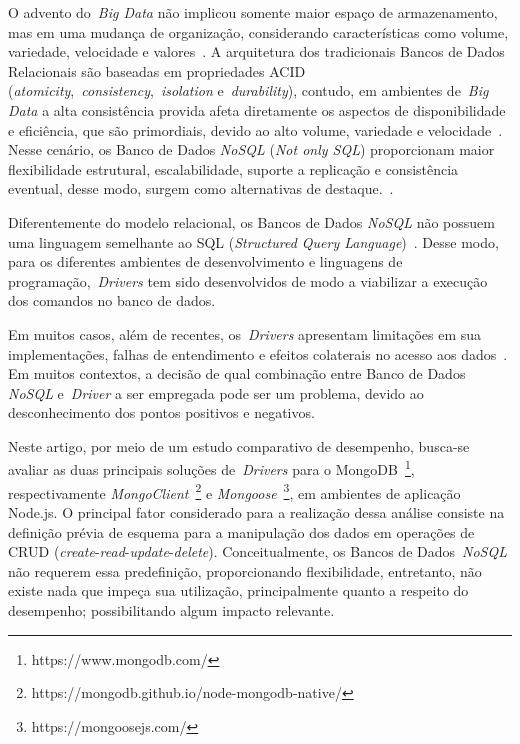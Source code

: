 \documentclass[12pt]{article}
\begin{document}
O advento do~\emph{Big Data} não implicou somente maior espaço de armazenamento, mas em uma mudança de organização, considerando características como volume, variedade, velocidade e valores~\cite{ward2013undefined}. 
A arquitetura dos tradicionais Bancos de Dados Relacionais são baseadas em propriedades ACID (\textit{atomicity},~\textit{consistency},~\textit{isolation} e~\textit{durability}), contudo, em ambientes de~\emph{Big Data} a alta consistência provida afeta diretamente os aspectos de disponibilidade e eficiência, que são primordiais, devido ao alto volume, variedade e velocidade~\cite{aparicio:2016}. 
Nesse cenário, os Banco de Dados \textit{NoSQL} (\emph{Not only SQL}) proporcionam maior flexibilidade estrutural, escalabilidade, suporte a replicação e consistência eventual, desse modo, surgem como alternativas de destaque.~\cite{han2011survey}. 
 
Diferentemente do modelo relacional, os Bancos de Dados \textit{NoSQL} não possuem uma linguagem semelhante ao SQL (\emph{Structured Query Language})~\cite{bugiotti2013object,sellami2014odbapi}. 
Desse modo, para os diferentes ambientes de desenvolvimento e linguagens de programação,~\emph{Drivers} tem sido desenvolvidos de modo a viabilizar a execução dos comandos no banco de dados. 

Em muitos casos, além de recentes, os~\emph{Drivers} apresentam limitações em sua implementações, falhas de entendimento e efeitos colaterais no acesso aos dados~\cite{rafique:2018}. 
Em muitos contextos, a decisão de qual combinação entre Banco de Dados \textit{NoSQL} e~\emph{Driver} a ser empregada pode ser um problema, devido ao desconhecimento dos pontos positivos e negativos.

Neste artigo, por meio de um estudo comparativo de desempenho, busca-se avaliar as duas principais soluções de~\emph{Drivers} para o MongoDB~\footnote{https://www.mongodb.com/}, respectivamente \emph{MongoClient}~\footnote{https://mongodb.github.io/node-mongodb-native/} e \emph{Mongoose}~\footnote{https://mongoosejs.com/}, em ambientes de aplicação Node.js. 
O principal fator considerado para a realização dessa análise consiste na definição prévia de esquema para a manipulação dos dados em operações de CRUD (\emph{create}-\emph{read}-\emph{update}-\emph{delete}). Conceitualmente, os Bancos de Dados~\textit{NoSQL} não requerem essa predefinição, proporcionando flexibilidade, entretanto, não existe nada que impeça sua utilização, principalmente quanto a respeito do desempenho; possibilitando algum impacto relevante.
\end{document}
